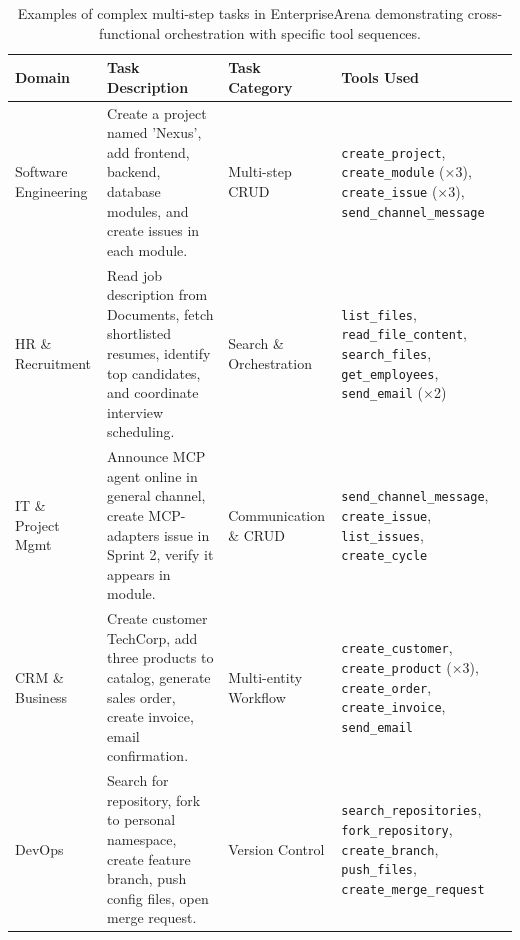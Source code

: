 \documentclass{article}
\theoremstyle{plain}
\theoremstyle{definition}
\theoremstyle{remark}
\begin{document}
\begin{table}[H]
\centering
\small
\caption{Examples of complex multi-step tasks in EnterpriseArena demonstrating cross-functional orchestration with specific tool sequences.}
\label{tab:complex_task_examples}
\begin{tabular}{p{2.5cm} p{5.5cm} p{2.5cm} p{3.0cm}}
\toprule
\textbf{Domain} & \textbf{Task Description} & \textbf{Task Category} & \textbf{Tools Used} \\
\midrule

Software Engineering & Create a project named 'Nexus', add frontend, backend, database modules, and create issues in each module. & Multi-step CRUD & \texttt{create\_project}, \texttt{create\_module} (×3), \texttt{create\_issue} (×3), \texttt{send\_channel\_message} \\

\midrule

HR \& Recruitment & Read job description from Documents, fetch shortlisted resumes, identify top candidates, and coordinate interview scheduling. & Search \& Orchestration & \texttt{list\_files}, \texttt{read\_file\_content}, \texttt{search\_files}, \texttt{get\_employees}, \texttt{send\_email} (×2) \\

\midrule

IT \& Project Mgmt & Announce MCP agent online in general channel, create MCP-adapters issue in Sprint 2, verify it appears in module. & Communication \& CRUD & \texttt{send\_channel\_message}, \texttt{create\_issue}, \texttt{list\_issues}, \texttt{create\_cycle} \\

\midrule

CRM \& Business & Create customer TechCorp, add three products to catalog, generate sales order, create invoice, email confirmation. & Multi-entity Workflow & \texttt{create\_customer}, \texttt{create\_product} (×3), \texttt{create\_order}, \texttt{create\_invoice}, \texttt{send\_email} \\

\midrule

DevOps & Search for repository, fork to personal namespace, create feature branch, push config files, open merge request. & Version Control & \texttt{search\_repositories}, \texttt{fork\_repository}, \texttt{create\_branch}, \texttt{push\_files}, \texttt{create\_merge\_request} \\

\midrule


\end{tabular}
\end{table}
\end{document}
